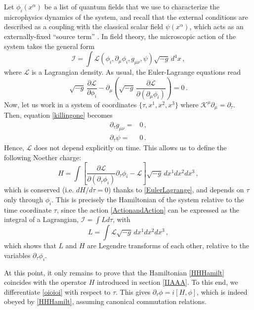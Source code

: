 \documentclass[a4paper, amsfonts, amssymb, amsmath, reprint, showkeys, nofootinbib, twoside, onecolumn,notitlepage]{revtex4-1}
\newcommand{\K}{{\mathcal{K}}}
\theoremstyle{definition}
\theoremstyle{theorem}
\begin{document}
Let $\phi_i(x^\alpha)$ be a list of quantum fields that we use to characterize the microphysics dynamics of the system, and recall that the external conditions are described as a coupling with the classical scalar field $\psi(x^\alpha)$, which acts as an externally-fixed ``source term'' \cite{GavassinoCovarianceThermo:2021kia}. In field theory, the microscopic action of the system takes the general form
\begin{equation}\label{ActionandAction}
\mathcal{I}=\int \mathcal{L}(\phi_i,\partial_\mu \phi_i,g_{\mu \nu},\psi)\sqrt{-g}\, d^4 x \, ,
\end{equation}
where $\mathcal{L}$ is a Lagrangian density. As usual, the Euler-Lagrange equations read
\begin{equation}\label{EulerLagrange}
\sqrt{-g} \,\dfrac{\partial \mathcal{L}}{\partial \phi_i}-\partial_\mu \left(\sqrt{-g} \,\dfrac{\partial \mathcal{L}}{\partial (\partial_\mu \phi_i)} \right) =0\, .
\end{equation}
Now, let us work in a system of coordinates $\{\tau,x^1,x^2,x^3\}$ where $\K^\mu \partial_\mu =\partial_\tau$. Then, equation \eqref{killingone} becomes
\begin{equation}\label{killingone2}
\begin{split}
\partial_\tau g_{\mu \nu}={}& 0 \, , \\
\partial_\tau \psi={}& 0 \, .
\end{split}
\end{equation}
Hence, $\mathcal{L}$  does not depend explicitly on time. This allows us to define the following Noether charge:
\begin{equation}\label{HHHamilt}
H =\int \left[\dfrac{\partial \mathcal{L}}{\partial(\partial_\tau \phi_i)} \partial_\tau \phi_i -\mathcal{L} \right] \sqrt{-g}\, dx^1 dx^2 dx^3 \, ,
\end{equation}
which is conserved (i.e. $dH/d\tau=0$) thanks to \eqref{EulerLagrange}, and depends on $\tau$ only through $\phi_i$. This is precisely the Hamiltonian of the system relative to the time coordinate $\tau$, since the action \eqref{ActionandAction} can be expressed as the integral of a Lagrangian, $\mathcal{I}=\int L d\tau$, with
\begin{equation}
L=\int \mathcal{L}\sqrt{-g}\, dx^1 dx^2 dx^3 \, ,
\end{equation}
which shows that $L$ and $H$ are Legendre transforms of each other, relative to the variables $\partial_\tau \phi_i$.

At this point, it only remains to prove that the Hamiltonian \eqref{HHHamilt} coincides with the operator $H$ introduced in section \ref{IIAAA}. To this end, we differentiate \eqref{oioioi} with respect to $\tau$. This gives $\partial_\tau \phi =i\left[H,\phi\right]$, which is indeed obeyed by \eqref{HHHamilt}, assuming canonical commutation relations.
\end{document}
